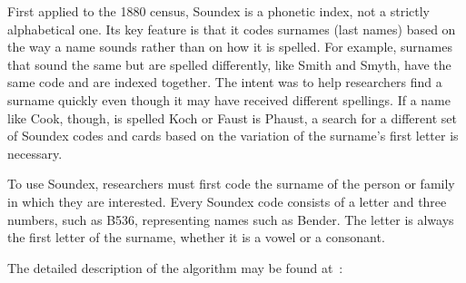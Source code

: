 
First applied to the 1880 census, Soundex is a phonetic index, not a
strictly alphabetical one. Its key feature is that it codes surnames
(last names) based on the way a name sounds rather than on how it is
spelled. For example, surnames that sound the same but are spelled
differently, like Smith and Smyth, have the same code and are indexed
together.  The intent was to help researchers find a surname quickly
even though it may have received different spellings. If a name like
Cook, though, is spelled Koch or Faust is Phaust, a search for a
different set of Soundex codes and cards based on the variation of the
surname's first letter is necessary.

To use Soundex, researchers must first code the surname of the person
or family in which they are interested. Every Soundex code consists of
a letter and three numbers, such as B536, representing names such as
Bender. The letter is always the first letter of the surname, whether
it is a vowel or a consonant.

The detailed description of the algorithm may be found at~:\\

